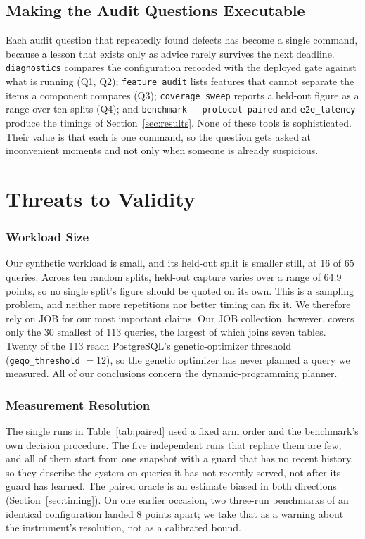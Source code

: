 \documentclass[conference]{IEEEtran}
\begin{document}
\subsection{Making the Audit Questions Executable}

Each audit question that repeatedly found defects has become a single command,
because a lesson that exists only as advice rarely survives the next deadline.
\texttt{diagnostics} compares the configuration recorded with the deployed gate
against what is running (Q1, Q2); \texttt{feature\_audit} lists features that
cannot separate the items a component compares (Q3); \texttt{coverage\_sweep}
reports a held-out figure as a range over ten splits (Q4); and
\texttt{benchmark -{}-protocol paired} and \texttt{e2e\_latency} produce the
timings of Section~\ref{sec:results}. None of these tools is sophisticated.
Their value is that each is one command, so the question gets asked at
inconvenient moments and not only when someone is already suspicious.

\section{Threats to Validity}
\label{sec:threats}

\subsubsection{Workload Size}
Our synthetic workload is small, and its held-out split
is smaller still, at 16 of 65 queries. Across ten random splits, held-out
capture varies over a range of 64.9 points, so no single split's figure should
be quoted on its own. This is a sampling problem, and neither more repetitions
nor better timing can fix it. We therefore rely on JOB for our most important
claims. Our JOB collection, however, covers only the 30 smallest of 113 queries,
the largest of which joins seven tables. Twenty of the 113 reach PostgreSQL's
genetic-optimizer threshold (\texttt{geqo\_threshold} $= 12$), so the genetic
optimizer has never planned a query we measured. All of our conclusions concern
the dynamic-programming planner.

\subsubsection{Measurement Resolution}
The single runs in Table~\ref{tab:paired} used a fixed arm order and the
benchmark's own decision procedure. The five independent runs that replace them
are few, and all of them start from one snapshot with a guard that has no
recent history, so they describe the system on queries it has not recently
served, not after its guard has learned. The paired oracle is an estimate
biased in both directions (Section~\ref{sec:timing}). On one earlier occasion,
two three-run benchmarks of an identical configuration landed 8 points apart;
we take that as a warning about the instrument's resolution, not as a
calibrated bound.
\end{document}
